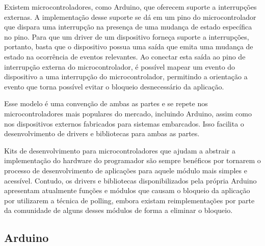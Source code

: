 \documentclass[11pt]{article}
\begin{document}
\par Existem microcontroladores, como Arduino, que oferecem suporte a interrupções externas. A implementação desse suporte se dá em um pino do microcontrolador que dispara uma interrupção na presença de uma mudança de estado específica no pino. Para que um driver de um dispositivo forneça suporte a interrupções, portanto, basta que o dispositivo possua uma saída que emita uma mudança de estado na ocorrência de eventos relevantes. Ao conectar esta saída ao pino de interrupção externa do microcontrolador, é possível mapear um evento do dispositivo a uma interrupção do microcontrolador, permitindo a orientação a evento que torna possível evitar o bloqueio desnecessário da aplicação.
\par Esse modelo é uma convenção de ambas as partes e se repete nos microcontroladores mais populares do mercado, incluindo Arduino, assim como nos dispositivos externos fabricados para sistemas embarcados. Isso facilita o desenvolvimento de drivers e bibliotecas para ambas as partes.
\par Kits de desenvolvimento para microcontroladores que ajudam a abstrair a implementação do hardware do programador são sempre benéficos por tornarem o processo de desenvolvimento de aplicações para aquele módulo mais simples e acessível. Contudo, os drivers e bibliotecas disponibilizados pela própria Arduino apresentam atualmente funções e módulos que causam o bloqueio da aplicação por utilizarem a técnica de polling, embora existam reimplementações por parte da comunidade de alguns desses módulos de forma a eliminar o bloqueio.

\subsection{Arduino}
\end{document}
